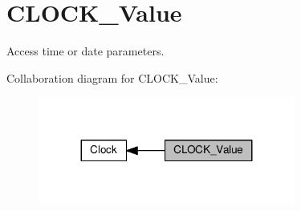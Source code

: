 \hypertarget{group___c_l_o_c_k___value}{}\section{C\+L\+O\+C\+K\+\_\+\+Value}
\label{group___c_l_o_c_k___value}


Access time or date parameters.  


Collaboration diagram for C\+L\+O\+C\+K\+\_\+\+Value\+:\nopagebreak
\begin{figure}[H]
\begin{center}
\leavevmode
\includegraphics[width=239pt]{d4/dc0/group___c_l_o_c_k___value}
\end{center}
\end{figure}
